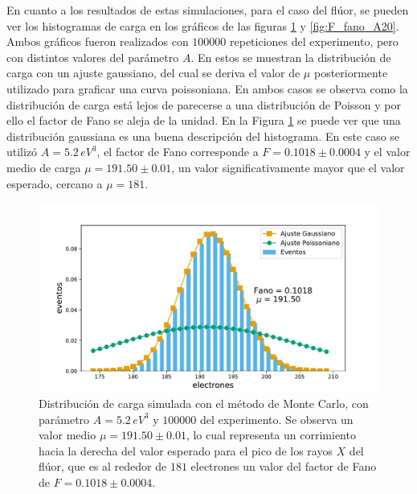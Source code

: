 En cuanto a los resultados de estas simulaciones, para el caso del flúor, se pueden ver los histogramas de carga en los gráficos de las figuras \ref{fig:F_fano_A5.2} y \ref{fig:F_fano_A20}. Ambos gráficos fueron realizados con $100000$ repeticiones del experimento, pero con distintos valores del parámetro $A$. En estos se muestran la distribución de carga con un ajuste gaussiano, del cual se deriva el valor de $\mu$ posteriormente utilizado para graficar una curva poissoniana. En ambos casos se observa como la distribución de carga está lejos de parecerse a una distribución de Poisson y por ello el factor de Fano se aleja de la unidad. En la Figura \ref{fig:F_fano_A5.2} se puede ver que una distribución gaussiana es una buena descripción del histograma. En este caso se utilizó $A = 5.2\,\si{eV}^{3}$, el factor de Fano corresponde a $F = 0.1018 \pm 0.0004$ y el valor medio de carga $\mu = 191.50 \pm 0.01$, un valor significativamente mayor que el valor esperado, cercano a $\mu = 181$.
\begin{figure}[h]
    \centering
    \includegraphics[scale=0.5]{Figs/F_Fano_E677_A5.2_Eloss0_100ktrials.pdf}
    \caption{Distribución de carga simulada con el método de Monte Carlo, con parámetro $A = 5.2\,\si{eV}^{3}$ y $100000$ del experimento. Se observa un valor medio $\mu = 191.50 \pm 0.01$, lo cual representa un corrimiento hacia la derecha del valor esperado para el pico de los rayos $X$ del flúor, que es al rededor de $181$ electrones un valor del factor de Fano de $F = 0.1018 \pm 0.0004$.}
    \label{fig:F_fano_A5.2}
\end{figure}
